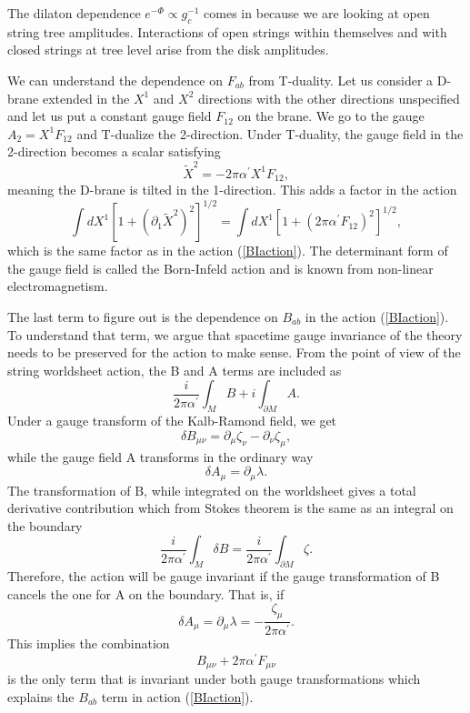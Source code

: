 \documentclass[12pt,letterpaper]{article}
\def\be{\begin{equation}}
\def\ee{\end{equation}}
\begin{document}
The dilaton dependence $e^{-\Phi}\propto g_{c}^{-1}$ comes in because we are looking at open string tree amplitudes.  Interactions of open strings within themselves and with closed strings at tree level arise from the disk amplitudes.

We can understand the dependence on $F_{ab}$ from T-duality.  Let us consider a D-brane extended in the $X^{1}$ and $X^{2}$ directions with the other directions unspecified and let us put a constant gauge field $F_{12}$ on the brane.  We go to the gauge $A_{2}=X^{1}F_{12}$ and T-dualize the 2-direction.  Under T-duality, the gauge field in the 2-direction becomes a scalar satisfying
\be
\tilde{X}^{2}=-2\pi\alpha^{\prime}X^{1}F_{12},
\ee
meaning the D-brane is tilted in the 1-direction.  This adds a factor in the action
\be
\int dX^{1}\left[1+\left(\partial_{1}\tilde{X}^{2}\right)^{2}\right]^{1/2}=\int dX^{1}\left[1+\left(2\pi\alpha^{\prime}F_{12}\right)^{2}\right]^{1/2},
\ee
which is the same factor as in the action (\ref{BIaction}).  The determinant form of the gauge field is called the Born-Infeld action and is known from non-linear electromagnetism.  

The last term to figure out is the dependence on $B_{ab}$ in the action (\ref{BIaction}).  To understand that term, we argue that spacetime gauge invariance of the theory needs to be preserved for the action to make sense.  From the point of view of the string worldsheet action, the B and A terms are included as
\be
\frac{i}{2\pi\alpha^{\prime}}\int_{M}B+i\int_{\partial M}A.
\ee
Under a gauge transform of the Kalb-Ramond field, we get
\be
\delta B_{\mu\nu}=\partial_{\mu}\zeta_{\nu}-\partial_{\nu}\zeta_{\mu},
\ee
while the gauge field A transforms in the ordinary way
\be
\delta A_{\mu}=\partial_{\mu}\lambda.
\ee
The transformation of B, while integrated on the worldsheet gives a total derivative contribution which from Stokes theorem is the same as an integral on the boundary
\be
\frac{i}{2\pi\alpha^{\prime}}\int_{M}\delta B=\frac{i}{2\pi\alpha^{\prime}}\int_{\partial  M} \zeta.
\ee
Therefore, the action will be gauge invariant if the gauge transformation of B cancels the one for A on the boundary.  That is, if
\be
\delta A_{\mu}=\partial_{\mu}\lambda=-\frac{\zeta_{\mu}}{2\pi\alpha^{\prime}}.
\ee
This implies the combination 
\be
B_{\mu\nu}+2\pi\alpha^{\prime}F_{\mu\nu}
\ee
is the only term that is invariant under both gauge transformations which explains the $B_{ab}$ term in action (\ref{BIaction}).
\end{document}
